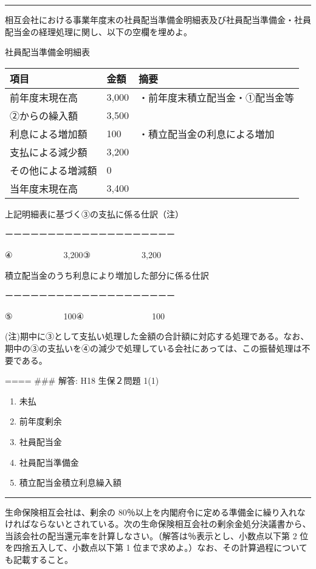 \documentclass[report,gutter=10mm,fore-edge=10mm,uplatex,dvipdfmx]{jlreq}
\begin{document}
\begin{center}\rule{0.5\linewidth}{0.5pt}\end{center}


相互会社における事業年度末の社員配当準備金明細表及び社員配当準備金・社員配当金の経理処理に関し、以下の空欄を埋めよ。

社員配当準備金明細表

\begin{longtable}[]{@{}lll@{}}
\toprule
項目 & 金額 & 摘要\tabularnewline
\midrule
\endhead
前年度末現在高 & 3,000 & ・前年度末積立配当金・①配当金等\tabularnewline
②からの繰入額 & 3,500 &\tabularnewline
利息による増加額 & 100 & ・積立配当金の利息による増加\tabularnewline
支払による減少額 & 3,200 &\tabularnewline
その他による増減額 & 0 &\tabularnewline
当年度末現在高 & 3,400 &\tabularnewline
\bottomrule
\end{longtable}

上記明細表に基づく③の支払に係る仕訳（注）

ーーーーーーーーーーーーーーーーーーーー

④　　　　　　3,200\textbar③　　　　　　3,200

積立配当金のうち利息により増加した部分に係る仕訳

ーーーーーーーーーーーーーーーーーーーー

⑤　　　　　　100\textbar④　　　　　　　　100

(注)期中に③として支払い処理した金額の合計額に対応する処理である。なお、期中の③の支払いを④の減少で処理している会社にあっては、この振替処理は不要である。

==== \#\#\# 解答: H18 生保２問題 1(1)

\begin{enumerate}
\tightlist
\item
  未払
\item
  前年度剰余
\item
  社員配当金
\item
  社員配当準備金
\item
  積立配当金積立利息繰入額
\end{enumerate}

\begin{center}\rule{0.5\linewidth}{0.5pt}\end{center}


生命保険相互会社は、剰余の
80％以上を内閣府令に定める準備金に繰り入れなければならないとされている。次の生命保険相互会社の剰余金処分決議書から、当該会社の配当還元率を計算しなさい。（解答は％表示とし、小数点以下第
2 位を四捨五入して、小数点以下第 1
位まで求めよ。）なお、その計算過程についても記載すること。
\end{document}
